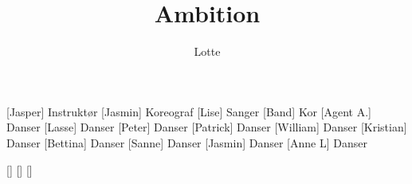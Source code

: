 \documentclass[a4paper,11pt]{article}
\title{Ambition}
\author{Lotte}
\begin{document}
\maketitle

\begin{roles}
[Jasper] Instruktør
[Jasmin] Koreograf
[Lise] Sanger
[Band] Kor
[Agent A.] Danser
[Lasse] Danser
[Peter] Danser
[Patrick] Danser
[William] Danser
[Kristian] Danser
[Bettina] Danser
[Sanne] Danser
[Jasmin] Danser
[Anne L] Danser
\end{roles}

\begin{props}
[]
[]
[]
\end{props}
\end{document}
